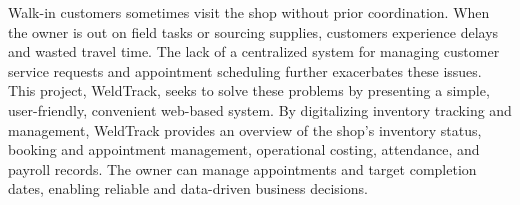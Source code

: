 \documentclass[12pt, letterpaper]{article}
\begin{document}
\hspace*{2em} Walk-in customers sometimes visit the shop without prior coordination. When the owner is out on field tasks or sourcing supplies, customers experience delays and wasted travel time. The lack of a centralized system for managing customer service requests and appointment scheduling further exacerbates these issues.
\hspace*{2em}This project, WeldTrack, seeks to solve these problems by presenting a simple, user-friendly, convenient web-based system. By digitalizing inventory tracking and management, WeldTrack provides an overview of the shop's inventory status, booking and appointment management, operational costing, attendance, and payroll records. The owner can manage appointments and target completion dates, enabling reliable and data-driven business decisions.
\end{document}
